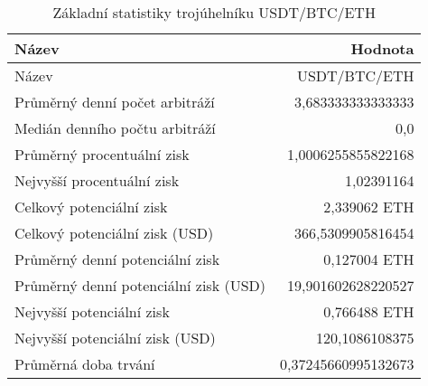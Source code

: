\begin{table}\centering
\caption{Základní statistiky trojúhelníku USDT/BTC/ETH}
\label{USDTBTCETH_stats}
\begin{tabular}{|| l | r ||}
\hline Název & Hodnota \\ 
\hline\hline Název & USDT/BTC/ETH \\ 
\hline Průměrný denní počet arbitráží & 3,683333333333333 \\ 
\hline Medián denního počtu arbitráží & 0,0 \\ 
\hline Průměrný procentuální zisk & 1,0006255855822168 \\ 
\hline Nejvyšší procentuální zisk & 1,02391164 \\ 
\hline Celkový potenciální zisk & 2,339062 ETH \\ 
\hline Celkový potenciální zisk (USD) & 366,5309905816454 \\ 
\hline Průměrný denní potenciální zisk & 0,127004 ETH \\ 
\hline Průměrný denní potenciální zisk (USD) & 19,901602628220527 \\ 
\hline Nejvyšší potenciální zisk & 0,766488 ETH \\ 
\hline Nejvyšší potenciální zisk (USD) & 120,1086108375 \\ 
\hline Průměrná doba trvání & 0,37245660995132673 \\ 
\hline
\end{tabular}
\end{table}